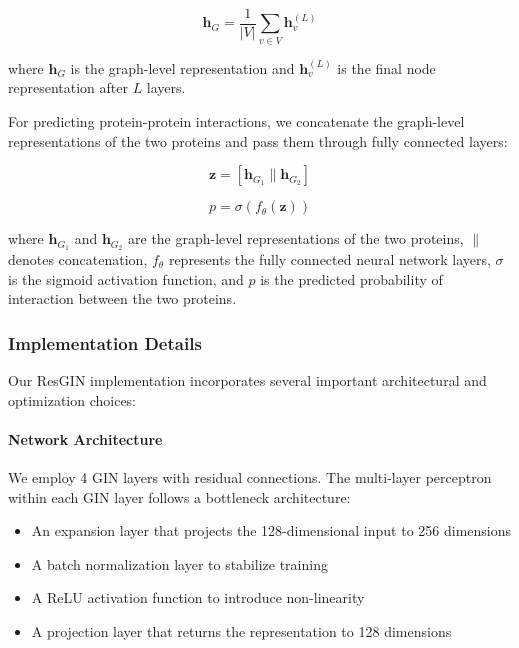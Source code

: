 \documentclass[conference]{IEEEtran}
\begin{document}
\begin{equation}
\mathbf{h}_G = \frac{1}{|V|} \sum_{v \in V} \mathbf{h}_v^{(L)}
\end{equation}

where $\mathbf{h}_G$ is the graph-level representation and $\mathbf{h}_v^{(L)}$ is the final node representation after $L$ layers.

For predicting protein-protein interactions, we concatenate the graph-level representations of the two proteins and pass them through fully connected layers:

\begin{equation}
\mathbf{z} = [\mathbf{h}_{G_1} \parallel \mathbf{h}_{G_2}]
\end{equation}

\begin{equation}
p = \sigma(f_{\theta}(\mathbf{z}))
\end{equation}

where $\mathbf{h}_{G_1}$ and $\mathbf{h}_{G_2}$ are the graph-level representations of the two proteins, $\parallel$ denotes concatenation, $f_{\theta}$ represents the fully connected neural network layers, $\sigma$ is the sigmoid activation function, and $p$ is the predicted probability of interaction between the two proteins.

\subsubsection{Implementation Details}
Our ResGIN implementation incorporates several important architectural and optimization choices:

\paragraph{Network Architecture}
We employ 4 GIN layers with residual connections. The multi-layer perceptron within each GIN layer follows a bottleneck architecture:
\begin{itemize}
    \item An expansion layer that projects the 128-dimensional input to 256 dimensions
    \item A batch normalization layer to stabilize training
    \item A ReLU activation function to introduce non-linearity
    \item A projection layer that returns the representation to 128 dimensions
\end{itemize}
\end{document}
